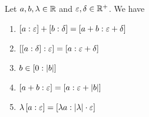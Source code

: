 \begin{theorem}
  Let $a,b,\lambda\in\R$ and $\epsilon,\delta\in\Rplus$. We have

  \begin{enumerate}
    \item $\an[\epsilon]{a}+\an[\delta]{b}=\an[\epsilon+\delta]{a+b}$
    \item $\an[\epsilon]{\an[\delta]{a}} = \an[\epsilon+\delta]{a}$
    \item $b \in \an[|b|]{0}$
    \item $\an[\epsilon]{a+b} = \an[\epsilon+\abs{b}]{a}$
    \item $\lambda \an[\epsilon]{a} = \an[\abs{\lambda}\cdot \epsilon]{\lambda a}$
  \end{enumerate}
\end{theorem}
